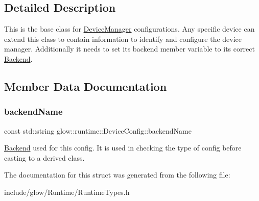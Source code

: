 \subsection{Detailed Description}
This is the base class for \hyperlink{classglow_1_1runtime_1_1_device_manager}{Device\+Manager} configurations. Any specific device can extend this class to contain information to identify and configure the device manager. Additionally it needs to set it\textquotesingle{}s backend member variable to it\textquotesingle{}s correct \hyperlink{classglow_1_1_backend}{Backend}. 

\subsection{Member Data Documentation}
\mbox{\label{structglow_1_1runtime_1_1_device_config_af0b3f3f4020ac329221ee3e635405ba3}} 
\subsubsection{\texorpdfstring{backend\+Name}{backendName}}
{\footnotesize\ttfamily const std\+::string glow\+::runtime\+::\+Device\+Config\+::backend\+Name}

\hyperlink{classglow_1_1_backend}{Backend} used for this config. It is used in checking the type of config before casting to a derived class. 

The documentation for this struct was generated from the following file\+:\begin{DoxyCompactItemize}
\item 
include/glow/\+Runtime/Runtime\+Types.\+h\end{DoxyCompactItemize}
